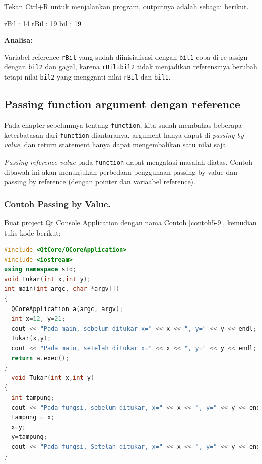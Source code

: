 Tekan Ctrl+R untuk menjalankan program, outputnya adalah sebagai
berikut.

\begin{lcverbatim}
rBil : 14
rBil : 19
bil : 19
\end{lcverbatim}

\textbf{Analisa:}

Variabel reference \texttt{rBil} yang sudah diinisialisasi dengan
\texttt{bil1} coba di re-assign dengan \texttt{bil2} dan gagal, karena
\texttt{rBil=bil2} tidak menjadikan referensinya berubah tetapi nilai
\texttt{bil2} yang mengganti nilai \texttt{rBil} dan \texttt{bil1}.

\subsection{Passing function argument dengan
reference}\label{passing-function-argument-dengan-reference}

Pada chapter sebelumnya tentang \texttt{function}, kita sudah membahas
beberapa keterbatasan dari \texttt{function} diantaranya, argument hanya
dapat di-\emph{passing by value}, dan return statement hanya dapat
mengembalikan satu nilai saja.

\emph{Passing reference value} pada \texttt{function} dapat mengatasi
masalah diatas. Contoh dibawah ini akan menunjukan perbedaan penggunaan
passing by value dan passing by reference (dengan pointer dan variaabel
reference).

\subsubsection*{Contoh  Passing by Value.}

Buat project Qt Console Application dengan nama Contoh \ref{contoh5-9}, kemudian tulis
kode berikut:

\begin{lstlisting}[language=c++, caption=Passing by Value, label=contoh5-9]
#include <QtCore/QCoreApplication>
#include <iostream>
using namespace std;
void Tukar(int x,int y);
int main(int argc, char *argv[])
{
  QCoreApplication a(argc, argv);
  int x=12, y=21;
  cout << "Pada main, sebelum ditukar x=" << x << ", y=" << y << endl;
  Tukar(x,y);
  cout << "Pada main, setelah ditukar x=" << x << ", y=" << y << endl;
  return a.exec();
}
  void Tukar(int x,int y)
{
  int tampung;
  cout << "Pada fungsi, sebelum ditukar, x=" << x << ", y=" << y << endl;
  tampung = x;
  x=y;
  y=tampung;
  cout << "Pada fungsi, Setelah ditukar, x=" << x << ", y=" << y << endl;
}
\end{lstlisting}

